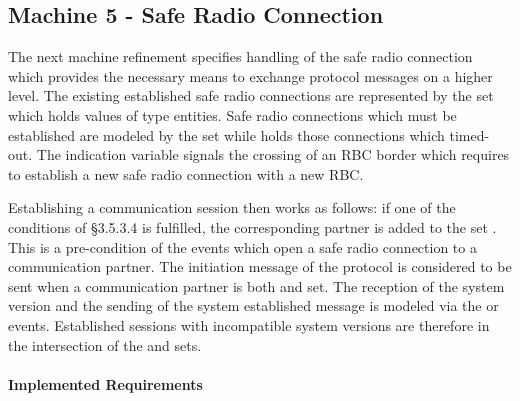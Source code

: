 \documentclass{template/openetcs_article}
\begin{document}


\subsection{Machine 5 - Safe Radio Connection}
\label{sec:machine-5-safe}

The next machine refinement specifies handling of the safe radio connection
which provides the necessary means to exchange protocol messages on a higher
level. The existing established safe radio connections are represented by the
set  which holds values of type entities. Safe radio
connections which must be established are modeled by the set
 while  holds
those connections which timed-out. The indication variable
 signals the crossing of an RBC border which requires
to establish a new safe radio connection with a new RBC.

Establishing a communication session then works as follows: if one of the
conditions of §3.5.3.4 is fulfilled, the corresponding partner is added to the
set . This is a pre-condition of the events which open a safe
radio connection to a communication partner. The initiation message of the
protocol is considered to be sent when a communication partner is both
 and  set. The reception of the system
version and the sending of the system established message is modeled via the
 or
 events. Established sessions with
incompatible system versions are therefore in the intersection of the
 and  sets.

\paragraph{Implemented Requirements}
\label{sec:impl-requ-4}
\end{document}
